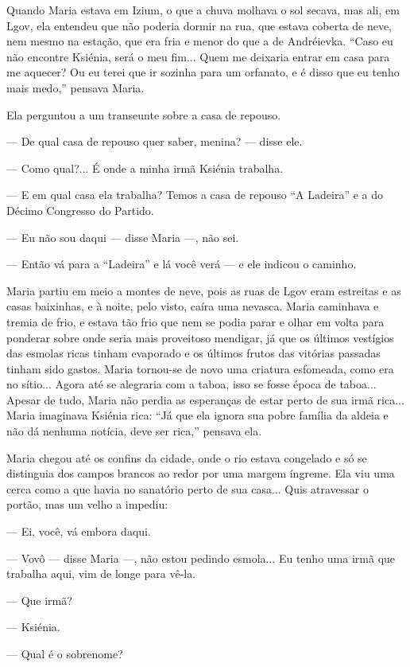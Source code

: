 Quando Maria estava em Izium, o que a chuva molhava o sol secava, mas
ali, em Lgov, ela entendeu que não poderia dormir na rua, que estava
coberta de neve, nem mesmo na estação, que era fria e menor do que a de
Andréievka. ``Caso eu não encontre Ksiénia, será o meu fim... Quem me
deixaria entrar em casa para me aquecer? Ou eu terei que ir sozinha para
um orfanato, e é disso que eu tenho mais medo,'' pensava Maria.

Ela perguntou a um transeunte sobre a casa de repouso.

--- De qual casa de repouso quer saber, menina? --- disse ele.

--- Como qual?... É onde a minha irmã Ksiénia trabalha.

--- E em qual casa ela trabalha? Temos a casa de repouso ``A Ladeira'' e
a do Décimo Congresso do Partido.

--- Eu não sou daqui --- disse Maria ---, não sei.

--- Então vá para a ``Ladeira'' e lá você verá --- e ele indicou o
caminho.

Maria partiu em meio a montes de neve, pois as ruas de Lgov eram
estreitas e as casas baixinhas, e à noite, pelo visto, caíra uma
nevasca. Maria caminhava e tremia de frio, e estava tão frio que nem se
podia parar e olhar em volta para ponderar sobre onde seria mais
proveitoso mendigar, já que os últimos vestígios das esmolas ricas
tinham evaporado e os últimos frutos das vitórias passadas tinham sido
gastos. Maria tornou-se de novo uma criatura esfomeada, como era no
sítio... Agora até se alegraria com a taboa, isso se fosse época de
taboa... Apesar de tudo, Maria não perdia as esperanças de estar perto
de sua irmã rica... Maria imaginava Ksiénia rica: ``Já que ela ignora
sua pobre família da aldeia e não dá nenhuma notícia, deve ser rica,''
pensava ela.

Maria chegou até os confins da cidade, onde o rio estava congelado e só
se distinguia dos campos brancos ao redor por uma margem íngreme. Ela
viu uma cerca como a que havia no sanatório perto de sua casa... Quis
atravessar o portão, mas um velho a impediu:

--- Ei, você, vá embora daqui.

--- Vovô --- disse Maria ---, não estou pedindo esmola... Eu tenho uma
irmã que trabalha aqui, vim de longe para vê-la.

--- Que irmã?

--- Ksiénia.

--- Qual é o sobrenome?

